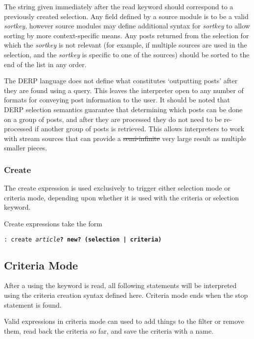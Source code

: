 The string given immediately after the read keyword should correspond to a previously created selection. 
Any field defined by a source module is to be a valid \emph{sortkey}, however source modules may define additional 
syntax for \emph{sortkey} to allow sorting by more context-specific means. Any posts returned from the selection 
for which the \emph{sortkey} is not relevant (for example, if multiple sources are used in the selection, and the 
\emph{sortkey} is specific to one of the sources) should be sorted to the end of the list in any order.

The DERP language does not define what constitutes ‘outputting posts’ after they are found using a query. 
This leaves the interpreter open to any number of formats for conveying post information to the user. 
It should be noted that DERP selection semantics guarantee that determining which posts can be done on a 
group of posts, and after they are processed they do not need to be re-processed if another group of posts 
is retrieved. This allows interpreters to work with stream sources that can provide a \st{semi-infinite} very 
large result as multiple smaller pieces.

\subsubsection{Create}
The create expression is used exclusively to trigger either selection mode or criteria mode, depending upon 
whether it is used with the criteria or selection keyword.

Create expressions take the form
\begin{center}
      \texttt{:  create \emph{article}\bf{?} new\bf{?} \bf{(}selection \bf{|} criteria\bf{)}}
\end{center}

\subsection{Criteria Mode}
After a  using the keyword  is read, all following statements will be interpreted using 
the criteria creation syntax defined here. Criteria mode ends when the stop statement is found.

Valid expressions in criteria mode can used to add things to the filter or remove them, read back the criteria so 
far, and save the criteria with a name.

